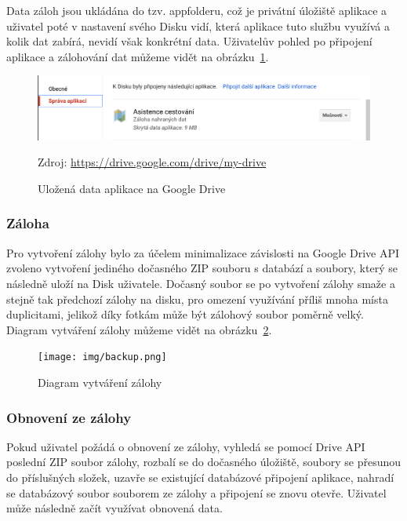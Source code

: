 \documentclass{article}
\begin{document}
 Data záloh jsou ukládána do tzv. appfolderu\cite{driveappfolder}, což je privátní úložiště aplikace
 a uživatel poté v nastavení svého Disku vidí,
  která aplikace tuto službu využívá a kolik dat zabírá, nevidí však konkrétní data.
  Uživatelův pohled po připojení aplikace a zálohování dat můžeme vidět na obrázku~\ref{fig:connecteddrive}.

\begin{figure}[H]
        \centering
                \includegraphics[scale=0.3]{img/connectedDrive.png}
        \caption{Uložená data aplikace na Google Drive}
        \label{fig:connecteddrive}
        \centering Zdroj: \url{https://drive.google.com/drive/my-drive}
\end{figure}

\subsubsection{Záloha}
Pro vytvoření zálohy bylo za účelem minimalizace závislosti na Google Drive API zvoleno vytvoření jediného
dočasného ZIP souboru s databází a soubory, který se následně uloží na Disk uživatele. Dočasný soubor se po
vytvoření zálohy smaže a stejně tak předchozí zálohy na disku, pro omezení využívání příliš mnoha místa duplicitami,
jelikož díky fotkám může být zálohový soubor poměrně velký. Diagram vytváření zálohy můžeme vidět na obrázku~\ref{fig:backup}.

\begin{figure}[H]
        \centering
                \texttt{[image: img/backup.png]}
        \caption{Diagram vytváření zálohy}
        \label{fig:backup}
\end{figure}

\subsubsection{Obnovení ze zálohy}
Pokud uživatel požádá o obnovení ze zálohy, vyhledá se pomocí Drive API poslední ZIP soubor zálohy,
rozbalí se do dočasného úložiště, soubory se přesunou do příslušných složek, uzavře se existující
databázové připojení aplikace, nahradí se databázový soubor souborem ze zálohy a připojení se znovu otevře.
Uživatel může následně začít využívat obnovená data.
\end{document}

